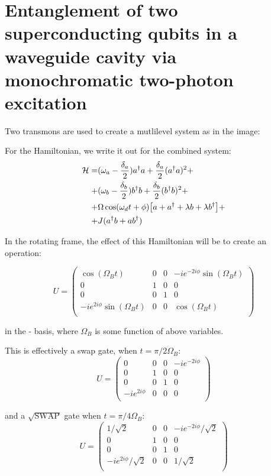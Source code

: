 \section{Entanglement of two superconducting qubits in a waveguide cavity via monochromatic two-photon excitation}
   Two transmons are used to create a mutlilevel system as in the image:
  
  For the Hamiltonian, we write it out for the combined system:
  \[
  	 \begin{aligned}
  	\mathcal{H} =	&(\omega_a-\frac{\delta_a}{2})a^{\dagger} a + \frac{\delta_a}{2}(a^{\dagger} a)^2+\\
  		+& (\omega_b-\frac{\delta_b}{2})b^{\dagger} b + \frac{\delta_b}{2}(b^{\dagger} b)^2+\\
  		+& \Omega\cos(\omega_dt+\phi)\big[a+a^{\dagger}+\lambda b + \lambda b^{\dagger}\big]+\\
  		+ & J(a^{\dagger} b + ab^{\dagger})
  	\end{aligned}
  \]
  
  In the rotating frame, the effect of this Hamiltonian will be to create an operation:
  
  \[
  U = \left(\begin{matrix}
  	\cos(\Omega_Bt) & 0 & 0 & -ie^{-2i\phi}\sin(\Omega_Bt)\\
  	  	0 & 1 & 0 & 0\\
  	  	  	0 & 0 & 1 & 0\\
  	  	  	  	-ie^{2i\phi}\sin(\Omega_Bt) & 0 & 0 & \cos(\Omega_Bt)\\
  \end{matrix}\right)
  \]
  
  \noindent in the - basis, where $ \Omega_B $ is some function of above variables.
  
  This is effectively a swap gate, when $ t = \pi/2\Omega_B $:
  \[
  U = \left(\begin{matrix}
  0 & 0 & 0 & -ie^{-2i\phi}\\
  0 & 1 & 0 & 0\\
  0 & 0 & 1 & 0\\
  -ie^{2i\phi} & 0 & 0 & 0\\
  \end{matrix}\right)
  \]
  
  \noindent and a $ \sqrt{\text{SWAP}} $ gate when $ t = \pi/4\Omega_B $:
  \[
  U = \left(\begin{matrix}
  1/\sqrt{2} & 0 & 0 & -ie^{-2i\phi}/\sqrt{2}\\
  0 & 1 & 0 & 0\\
  0 & 0 & 1 & 0\\
  -ie^{2i\phi}/\sqrt{2} & 0 & 0 & 1/\sqrt{2}\\
  \end{matrix}\right)
  \]
  
